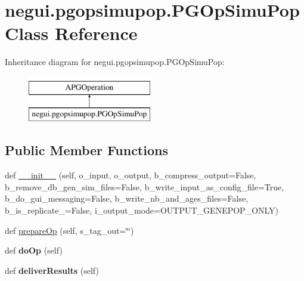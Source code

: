 \hypertarget{classnegui_1_1pgopsimupop_1_1PGOpSimuPop}{}\section{negui.\+pgopsimupop.\+P\+G\+Op\+Simu\+Pop Class Reference}
\label{classnegui_1_1pgopsimupop_1_1PGOpSimuPop}
Inheritance diagram for negui.\+pgopsimupop.\+P\+G\+Op\+Simu\+Pop\+:\begin{figure}[H]
\begin{center}
\leavevmode
\includegraphics[height=2.000000cm]{classnegui_1_1pgopsimupop_1_1PGOpSimuPop}
\end{center}
\end{figure}
\subsection*{Public Member Functions}
\begin{DoxyCompactItemize}
\item 
def \hyperlink{classnegui_1_1pgopsimupop_1_1PGOpSimuPop_a31cc8447a10c56667ae42093fb489c47}{\+\_\+\+\_\+init\+\_\+\+\_\+} (self, o\+\_\+input, o\+\_\+output, b\+\_\+compress\+\_\+output=False, b\+\_\+remove\+\_\+db\+\_\+gen\+\_\+sim\+\_\+files=False, b\+\_\+write\+\_\+input\+\_\+as\+\_\+config\+\_\+file=True, b\+\_\+do\+\_\+gui\+\_\+messaging=False, b\+\_\+write\+\_\+nb\+\_\+and\+\_\+ages\+\_\+files=False, b\+\_\+is\+\_\+replicate\+\_=False, i\+\_\+output\+\_\+mode=O\+U\+T\+P\+U\+T\+\_\+\+G\+E\+N\+E\+P\+O\+P\+\_\+\+O\+N\+LY)
\item 
def \hyperlink{classnegui_1_1pgopsimupop_1_1PGOpSimuPop_a2f255ee2acb3d3f0341cc2f7cf1e3ad3}{prepare\+Op} (self, s\+\_\+tag\+\_\+out=\char`\"{}\char`\"{})
\item 
def {\bfseries do\+Op} (self)\hypertarget{classnegui_1_1pgopsimupop_1_1PGOpSimuPop_aed657d7d631aa0e8c2f40f8411c95dcd}{}\label{classnegui_1_1pgopsimupop_1_1PGOpSimuPop_aed657d7d631aa0e8c2f40f8411c95dcd}

\item 
def {\bfseries deliver\+Results} (self)\hypertarget{classnegui_1_1pgopsimupop_1_1PGOpSimuPop_a35c9e5794e68274f42147644b2e968c5}{}\label{classnegui_1_1pgopsimupop_1_1PGOpSimuPop_a35c9e5794e68274f42147644b2e968c5}

\end{DoxyCompactItemize}
